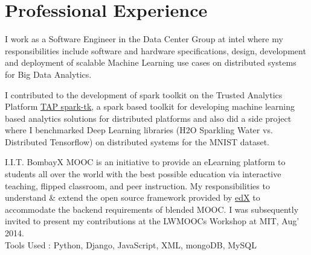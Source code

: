 \documentclass[hidelinks,letterpaper]{deedy-resume-openfont} %
\begin{document}
\begin{minipage}[t]{0.66\textwidth} %




\section{Professional Experience}
{}
\small I work as a Software Engineer in the Data Center Group at intel where my responsibilities include software and hardware specifications, design, development and deployment of scalable Machine Learning use cases on distributed systems for Big Data Analytics.
\sectionsep

\small I contributed to the development of spark toolkit on the Trusted Analytics Platform \href{https://github.com/trustedanalytics/spark-tk}{\underline{TAP spark-tk}}, a spark based toolkit for developing machine learning based analytics solutions for distributed platforms and also did a side project where I benchmarked Deep Learning libraries (H2O Sparkling Water vs. Distributed Tensorflow) on distributed systems for the MNIST dataset.
\sectionsep

\small I.I.T. BombayX MOOC is an initiative to provide an eLearning platform to students all over the world with the best possible education via interactive teaching, flipped classroom, and peer instruction. My responsibilities to understand \& extend the open source framework provided by \href{https://github.com/edx/edx-platform}{\underline{edX}} to accommodate the backend requirements of blended MOOC. I was subsequently invited to present my contributions at the LWMOOCs Workshop at MIT, Aug' 2014.
\\Tools Used : Python, Django, JavaScript, XML, mongoDB, MySQL


\end{minipage}
\end{document}
